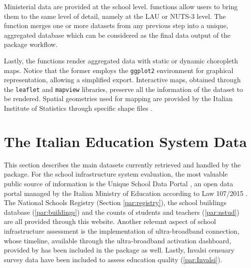 \documentclass[openany]{book}
\begin{document}
Ministerial data are provided at the school level. \texttt{} functions allow users to bring them to the same level of detail, namely at the LAU or NUTS-3 level. 
The function \texttt{} merges one or more datasets from any previous step into a unique, aggregated database which can be considered as the final data output of the package workflow.

Lastly, the \texttt{} functions render aggregated data with static or dynamic choropleth maps. Notice that the former employs the \texttt{ggplot2} \citep{ggplot} environment for graphical representation, allowing a simplified export. Interactive maps, obtained through the \texttt{leaflet} \citep{leaflet} and \texttt{mapview} \citep{mapview} libraries, preserve all the information of the dataset to be rendered. Spatial geometries used for mapping are provided by the Italian Institute of Statistics through specific shape files \citep{Shapefiles}.

 

\section{The Italian Education System Data} \label{section:Data}
This section describes the main datasets currently retrieved and handled by the package. For the school infrastructure system evaluation, the most valuable public source of information is the Unique School Data Portal \citep{MIUR}, an open data portal managed by the Italian Ministry of Education according to Law 107/2015 \citep{law2}. The National Schools Registry (Section \ref{par:registry}), the school buildings database (\ref{par:buildings}) and the counts of students and teachers (\ref{par:nstud}) are all provided through this website. Another relevant aspect of school infrastructure assessment is the implementation of ultra-broadband connection, whose timeline, available through the ultra-broadband activation dashboard, provided by \cite{BB} has been included in the package as well.
Lastly, Invalsi censuary survey data \citep{Invalsi_IS} have been included to assess education quality (\ref{par:Invalsi}).
\end{document}
